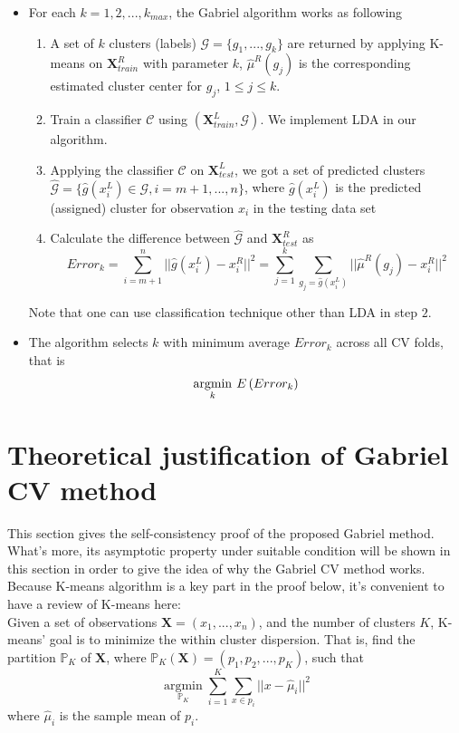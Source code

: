 \documentclass[11pt]{article}
\begin{document}
\begin{itemize}
	\item For each $k = 1,2,...,k_{max}$, the Gabriel algorithm works as following
	\begin{enumerate}
 	\item A set of $k$ clusters (labels) $ \mathcal{G}= \{g_1,...,g_k\} $ are returned by applying K-means on $\mathbf{X}^R_{train}$ with parameter $k$, $\hat{\mu}^R \left(g_j\right)$ is the corresponding estimated cluster center for $g_j$, $1 \leq j \leq k$.  
 	\item Train a classifier $\mathcal{C}$ using $\left(\mathbf{X}^L_{train}, \mathcal{G} \right)$. We implement LDA in our algorithm.
 	\item Applying the classifier $\mathcal{C}$ on $\mathbf{X}^L_{test}$, we got a set of predicted clusters $\hat{\mathcal{G}} = \{\hat{g} \left(x^L_i\right) \in \mathcal{G}, i = m+1,...,n \}$, where $\hat{g} \left(x^L_i\right)$ is the predicted (assigned) cluster for observation $x_i$ in the testing data set   
 	\item Calculate the difference between $\hat{\mathcal{G}}$ and  $\mathbf{X}^R_{test}$ as
 	\[Error_k = \sum^n_{i = m+1} ||\hat{g} \left(x^L_i\right) - x^R_i||^2 = \sum^k_{j=1} \sum_{g_j = \hat{g} \left(x^L_i\right)} ||\hat{\mu}^R \left(g_j\right) - x^R_i||^2\]
 	\end{enumerate}
	Note that one can use classification technique other than LDA in step $2.$
\noindent
	\item The algorithm selects $k$ with minimum average $Error_k$ across all CV folds, that is $$\underset{k}{\operatorname{argmin}} \hspace{0.05 in} E\left(Error_k\right) $$
\end{itemize}
\section{Theoretical justification of Gabriel CV method}
This section gives the self-consistency proof of the proposed Gabriel method. What's more, its asymptotic property under suitable condition will be shown in this section in order to give the idea of why the Gabriel CV method works.\\

Because K-means algorithm is a key part in the proof below, it's convenient to have a review of K-means here:\\
Given a set of observations $\mathbf{X} = (x_1,...,x_n)$, and the number of clusters $K$, K-means' goal is to minimize the within cluster dispersion. That is, find the partition $\mathbb{P}_K$ of $\mathbf{X}$, where $\mathbb{P}_K(\mathbf{X})= (p_1,p_2,...,p_K)$, such that
\[	\underset{\mathbb{P}_K}{\operatorname{argmin}} \sum^K_{i=1}\sum_{x \in p_i } ||x-\hat{\mu}_i||^2\]
where $\hat{\mu}_i$ is the sample mean of $p_i$.
\end{document}
